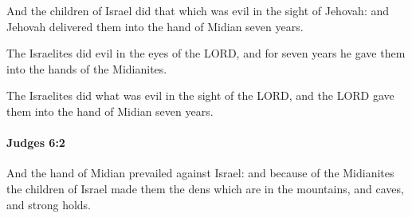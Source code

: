 			\begin{versebox}
					\item[BHS] 
					\item[ASV] And the children of Israel did that which was evil in the sight of Jehovah: and Jehovah delivered them into the hand of Midian seven years.
					\item[NIV] The Israelites did evil in the eyes of the LORD, and for seven years he gave them into the hands of the Midianites.
					\item[NRSV] The Israelites did what was evil in the sight of the LORD, and the LORD gave them into the hand of Midian seven years.
			\end{versebox}

		\paragraph{Judges 6:2} %
			\label{JUDGES-6-2}

			And the hand of Midian prevailed against Israel: and because of the Midianites the children of Israel made them the dens which are in the mountains, and caves, and strong holds.

